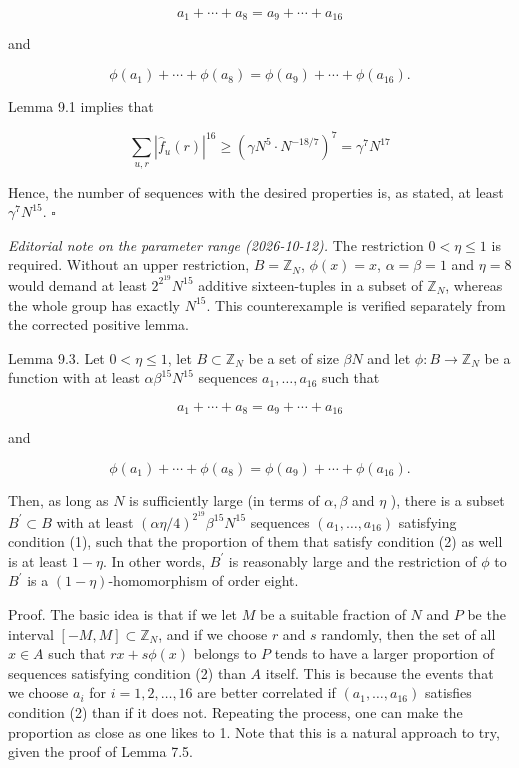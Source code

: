\documentclass[10pt]{article}
\begin{document}
$$
a_{1}+\cdots+a_{8}=a_{9}+\cdots+a_{16}
$$

and

$$
\phi\left(a_{1}\right)+\cdots+\phi\left(a_{8}\right)=\phi\left(a_{9}\right)+\cdots+\phi\left(a_{16}\right) .
$$

Lemma 9.1 implies that

$$
\sum_{u, r}\left|\hat{f}_{u}(r)\right|^{16} \geqslant\left(\gamma N^{5} \cdot N^{-18 / 7}\right)^{7}=\gamma^{7} N^{17}
$$

Hence, the number of sequences with the desired properties is, as stated, at least $\gamma^{7} N^{15}$. \(\square\)

\emph{Editorial note on the parameter range (2026-10-12).}
The restriction $0<\eta\leqslant1$ is required. Without an upper restriction,
$B=\mathbb Z_N$, $\phi(x)=x$, $\alpha=\beta=1$ and $\eta=8$ would demand
at least $2^{2^{19}}N^{15}$ additive sixteen-tuples in a subset of
$\mathbb Z_N$, whereas the whole group has exactly $N^{15}$.
This counterexample is verified separately from the corrected positive lemma.

Lemma 9.3. Let $0<\eta\leqslant 1$, let $B \subset \mathbb{Z}_{N}$ be a set of size $\beta N$ and let $\phi: B \rightarrow \mathbb{Z}_{N}$ be a function with at least $\alpha \beta^{15} N^{15}$ sequences $a_{1}, \ldots, a_{16}$ such that


\begin{equation*}
a_{1}+\cdots+a_{8}=a_{9}+\cdots+a_{16} \tag{1}
\end{equation*}


and


\begin{equation*}
\phi\left(a_{1}\right)+\cdots+\phi\left(a_{8}\right)=\phi\left(a_{9}\right)+\cdots+\phi\left(a_{16}\right) . \tag{2}
\end{equation*}


Then, as long as $N$ is sufficiently large (in terms of $\alpha, \beta$ and $\eta$ ), there is a subset $B^{\prime} \subset B$ with at least $(\alpha \eta / 4)^{2^{19}} \beta^{15} N^{15}$ sequences $\left(a_{1}, \ldots, a_{16}\right)$ satisfying condition (1), such that the proportion of them that satisfy condition (2) as well is at least $1-\eta$. In other words, $B^{\prime}$ is reasonably large and the restriction of $\phi$ to $B^{\prime}$ is a $(1-\eta)$-homomorphism of order eight.

Proof. The basic idea is that if we let $M$ be a suitable fraction of $N$ and $P$ be the interval $[-M, M] \subset \mathbb{Z}_{N}$, and if we choose $r$ and $s$ randomly, then the set of all $x \in A$ such that $r x+s \phi(x)$ belongs to $P$ tends to have a larger proportion of sequences satisfying condition (2) than $A$ itself. This is because the events that we choose $a_{i}$ for $i=1,2, \ldots, 16$ are better correlated if $\left(a_{1}, \ldots, a_{16}\right)$ satisfies condition (2) than if it does not. Repeating the process, one can make the proportion as close as one likes to 1. Note that this is a natural approach to try, given the proof of Lemma 7.5.
\end{document}
